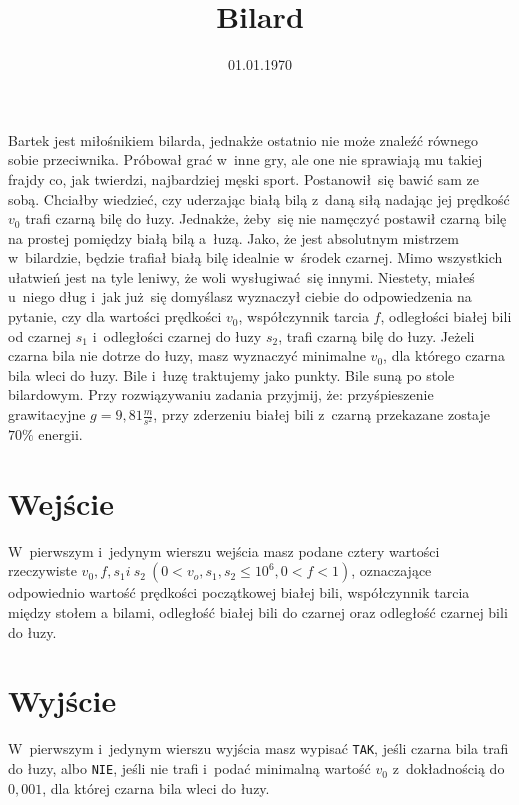 \documentclass[zad]{soigstyl}
\date{01.01.1970}
\title{\mbox{Bilard}}
\begin{document}
\begin{tasktext}%
    \noindent
    Bartek jest miłośnikiem bilarda, jednakże ostatnio nie może znaleźć równego sobie przeciwnika. Próbował grać w~inne gry, ale one nie sprawiają mu takiej frajdy co, jak twierdzi, najbardziej męski sport. Postanowił~się bawić sam ze sobą. Chciałby wiedzieć, czy uderzając białą bilą z~daną siłą nadając jej prędkość $v_0$ trafi czarną bilę do łuzy. Jednakże, żeby~się nie namęczyć postawił czarną bilę na prostej pomiędzy białą bilą a~łuzą. Jako, że jest absolutnym mistrzem w~bilardzie, będzie trafiał białą bilę idealnie w~środek czarnej. Mimo wszystkich ułatwień jest na tyle leniwy, że woli wysługiwać~się innymi. Niestety, miałeś u~niego dług i~jak już~się domyślasz wyznaczył ciebie do odpowiedzenia na pytanie, czy dla wartości prędkości $v_0$, współczynnik tarcia $f$, odległości białej bili od czarnej $s_1$ i~odległości czarnej do łuzy $s_2$, trafi czarną bilę do łuzy. Jeżeli czarna bila nie dotrze do łuzy, masz wyznaczyć minimalne $v_0$, dla którego czarna bila wleci do łuzy. Bile i~łuzę traktujemy jako punkty. Bile suną po stole bilardowym. Przy rozwiązywaniu zadania przyjmij, że: przyśpieszenie grawitacyjne $g = 9,81 \frac{m}{s^2}$, przy zderzeniu białej bili z~czarną przekazane zostaje $70\%$ energii.
	
    	\section{Wejście}
	W~pierwszym i~jedynym wierszu wejścia masz podane cztery wartości rzeczywiste $v_0, f, s_1 i~s_2~(0 < v_o, s_1, s_2 \leqslant 10^6, 0 < f < 1)$, oznaczające odpowiednio wartość prędkości początkowej białej bili, współczynnik tarcia między stołem a bilami, odległość białej bili do czarnej oraz odległość czarnej bili do łuzy.

	\section{Wyjście}
	W~pierwszym i~jedynym wierszu wyjścia masz wypisać \texttt{TAK}, jeśli czarna bila trafi do łuzy, albo \texttt{NIE}, jeśli nie trafi i~podać minimalną wartość $v_0$ z~dokładnością do $0,001$, dla której czarna bila wleci do łuzy.
	
	\oigprzyklady
\end{tasktext}
\end{document}
